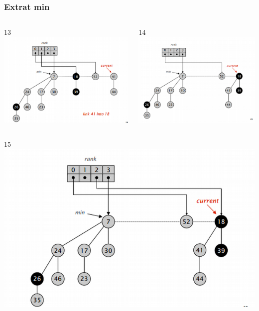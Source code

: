 \documentclass{beamer}
\begin{document}
   
 \begin{frame}
 \frametitle{Extrat min}
 \begin{columns}[t]
 13
    \includegraphics[width =0.9 \textwidth]{imagenes/delete13.png}
      
    14
    \includegraphics[width =0.9 \textwidth]{imagenes/delete14.png}

   \end{columns}
   \begin{columns}[t]
   15
    \includegraphics[width =0.9 \textwidth]{imagenes/delete15.png}
      

\end{columns}
\end{frame}
\end{document}
